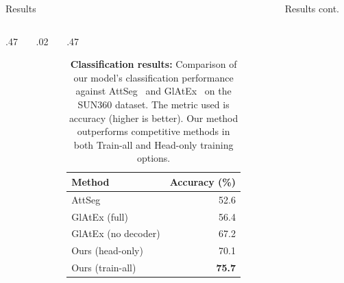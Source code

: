 \documentclass[final]{beamer}
\newlength{\sepwidth}
\newlength{\colwidth}
\newlength{\twocolwid}
\newcommand{\separatorcolumn}{\begin{column}{\sepwidth}\end{column}}
\begin{document}
\begin{frame}[t]
\begin{columns}[t]
\begin{column}{\twocolwid}
\begin{block}{Results}
\begin{columns}[t,totalwidth=\twocolwid]
\begin{column}{\colwidth}
\begin{columns}[t, totalwidth=\colwidth]
\begin{column}{.47\colwidth}
\end{column}
\begin{column}{.02\textwidth}\end{column}
\begin{column}{.47\colwidth}

\begin{table}[t]
\begin{center}
\begin{sc}
\begin{footnotesize}
\begin{tabular}{lr}
\toprule
Method & Accuracy (\%) \\
\midrule
AttSeg & 52.6\\
GlAtEx (full) & 56.4\\
GlAtEx (no decoder) & 67.2\\
Ours (head-only) & 70.1\\
Ours (train-all) & \textbf{75.7}\\
\bottomrule
\end{tabular}
\end{footnotesize}
\end{sc}
\end{center}
\vskip -0.1in
\caption{\textbf{Classification results:} Comparison of our model's classification performance against AttSeg~\protect\cite{seifi2020segment} and GlAtEx~\protect\cite{seifi2021glimpse} on the SUN360 dataset. The metric used is accuracy (higher is better). Our method outperforms competitive methods in both Train-all and Head-only training options.}
\label{tab:classification}
\end{table}
\vspace{-3ex}

\end{column}
\end{columns}


\end{column}

\end{columns}

\end{block}

\end{column}


\separatorcolumn

\begin{column}{\colwidth}
\begin{block}{Results cont.}


\vspace{-4ex}


\end{block}
\end{column}
\end{columns}
\end{frame}
\end{document}
